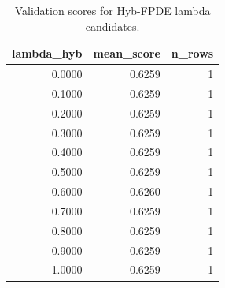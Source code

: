 \begin{table}[t]
\caption{Validation scores for Hyb-FPDE lambda candidates.}
\label{tab:lambda_distribution_computed}
\centering
\begin{tabular}{rrr}
\toprule
lambda\_hyb & mean\_score & n\_rows \\
\midrule
0.0000 & 0.6259 & 1 \\
0.1000 & 0.6259 & 1 \\
0.2000 & 0.6259 & 1 \\
0.3000 & 0.6259 & 1 \\
0.4000 & 0.6259 & 1 \\
0.5000 & 0.6259 & 1 \\
0.6000 & 0.6260 & 1 \\
0.7000 & 0.6259 & 1 \\
0.8000 & 0.6259 & 1 \\
0.9000 & 0.6259 & 1 \\
1.0000 & 0.6259 & 1 \\
\bottomrule
\end{tabular}

\end{table}
